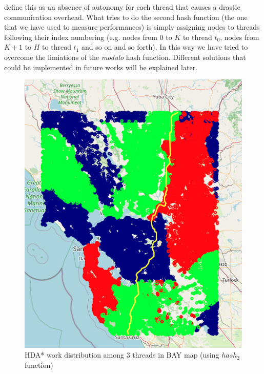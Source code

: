 \documentclass[twocolumn, switch]{article} %
\begin{document}
define this as an absence of autonomy for each thread that causes a drastic communication
overhead. What tries to do the second hash function (the one that we have used to 
measure performances) is simply assigning nodes to threads following their index
numbering (e.g. nodes from $0$ to $K$ to thread $t_0$, nodes from
$K+1$ to $H$ to thread $t_1$ and so on and so forth). In this way we have tried to overcome
the limiations of the \textit{modulo} hash function. Different solutions that could be implemented in future works will be explained later.
\begin{figure}[ht!]
  \centering
  \small
  \includegraphics[width=0.5\linewidth]{hda/hda_work_BAY2.png}
  \caption{HDA* work distribution among 3 threads in BAY map (using $hash_2$ function)}
  \label{hdawork2}
\end{figure}
\end{document}

